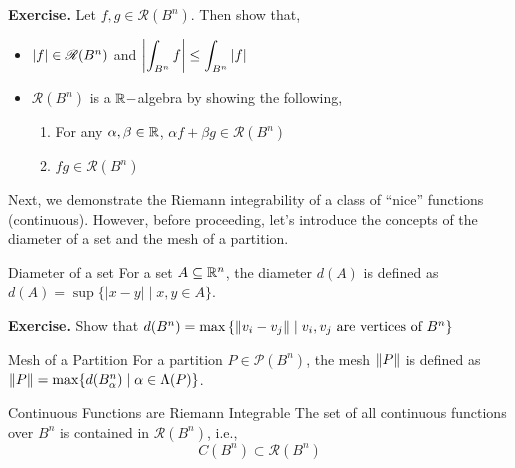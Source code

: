 \documentclass[../Analysis-3.tex]{subfiles}
\begin{document}
\textbf{Exercise.} Let $ f,g \in \mathscr{R}(B^n) $. Then show that,
\begin{itemize}
  \item $ \abs{f} \in \mathscr{R}(B^n) $ and $ \displaystyle \abs{\int_{B^n} f} \leq \int_{B^n} \abs{f} $
  \item  $ \mathscr{R}(B^n) $ is a $\mathbb{R}-$algebra by showing the following, \begin{enumerate}[label = (\roman*)]
          \item For any $ \alpha, \beta \in \mathbb{R} $,  $ \alpha f + \beta g \in \mathscr{R}(B^n) $
          \item $ fg \in \mathscr{R}(B^n) $
        \end{enumerate}
\end{itemize}

Next, we demonstrate the Riemann integrability of a class of ``nice'' functions (continuous). However, before proceeding, let's introduce the concepts of the diameter of a set and the mesh of a partition.

\begin{Def}{Diameter of a set}{}
  For a set $A \subseteq \mathbb{R}^n$, the diameter $d(A)$ is defined as $d(A) = \sup\{ |x-y| \mid x,y \in A \}$.
\end{Def}

\textbf{Exercise.} Show that $ d(B^n) = \max\left\{ \norm{v_i-v_j} \mid v_i, v_j \text{ are vertices of } B^n \right\} $

\begin{Def}{Mesh of a Partition}{}
  For a partition $P \in \mathscr{P}(B^n)$, the mesh $\norm{P}$ is defined as $\norm{P} = \max\{ d(B_{\alpha}^n) \mid \alpha \in \Lambda(P) \}$.
\end{Def}

\begin{Thm}{Continuous Functions are Riemann Integrable}{}
  The set of all continuous functions over $B^n$ is contained in $\mathscr{R}(B^n)$, i.e.,
  \[  C(B^n) \subset \mathscr{R}(B^n)  \]
\end{Thm}
\end{document}
